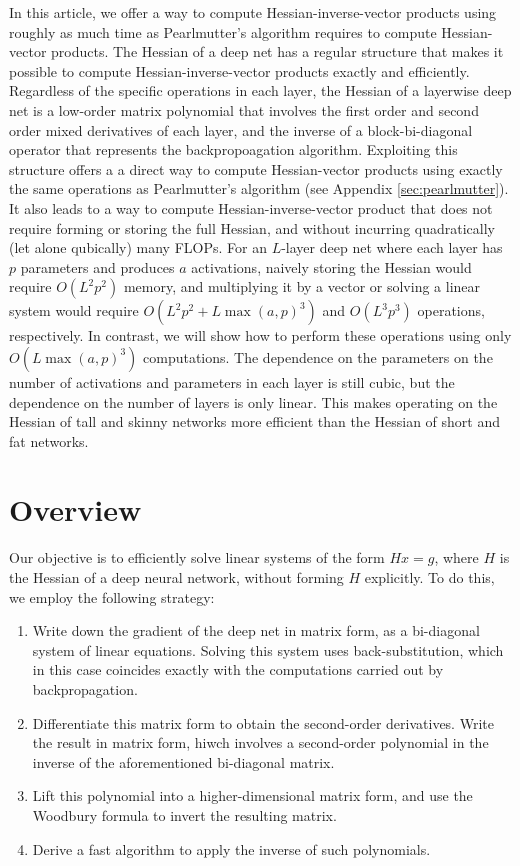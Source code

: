 \documentclass{article}
\begin{document}
In this article, we offer a way to compute Hessian-inverse-vector products using roughly as much time as Pearlmutter's
algorithm requires to compute Hessian-vector products. The Hessian of a deep net has a regular structure that makes it
possible to compute Hessian-inverse-vector products exactly and efficiently. Regardless of the specific operations in
each layer, the Hessian of a layerwise deep net is a low-order matrix polynomial that involves the first order and
second order mixed derivatives of each layer, and the inverse of a block-bi-diagonal operator that represents the
backpropoagation algorithm. Exploiting this structure offers a a direct way to compute Hessian-vector products using
exactly the same operations as Pearlmutter's algorithm (see Appendix \ref{sec:pearlmutter}). It also leads to a way to
compute Hessian-inverse-vector product that does not require forming or storing the full Hessian, and without incurring
quadratically (let alone qubically) many FLOPs. For an $L$-layer deep net where each layer has $p$ parameters and
produces $a$ activations, naively storing the Hessian would require $O(L^2p^2)$ memory, and multiplying it by a vector
or solving a linear system would require $O(L^2p^2 + L\max(a,p)^3)$ and $O(L^3p^3)$ operations, respectively. In
contrast, we will show how to perform these operations using only $O(L \max(a, p)^3)$ computations. The dependence on
the parameters on the number of activations and parameters in each layer is still cubic, but the dependence on the
number of layers is only linear. This makes operating on the Hessian of tall and skinny networks more efficient than
the Hessian of short and fat networks.

\section{Overview}

Our objective is to efficiently solve linear systems of the form $H x = g$, where $H$ is the Hessian of a deep neural
network, without forming $H$ explicitly. To do this, we employ the following strategy:
\begin{enumerate}
    \item
          Write down the gradient of the deep net in matrix form, as a bi-diagonal system of linear
          equations. Solving this system uses back-substitution, which in this case
          coincides exactly with the computations carried out by backpropagation.
    \item
          Differentiate this matrix form to obtain the second-order derivatives. Write the result in matrix form,
          hiwch involves a second-order polynomial in the inverse of the aforementioned bi-diagonal matrix.
    \item
          Lift this polynomial into a higher-dimensional matrix form, and use the Woodbury formula to invert the resulting
          matrix.
    \item
          Derive a fast algorithm to apply the inverse of such polynomials.
\end{enumerate}
\end{document}
